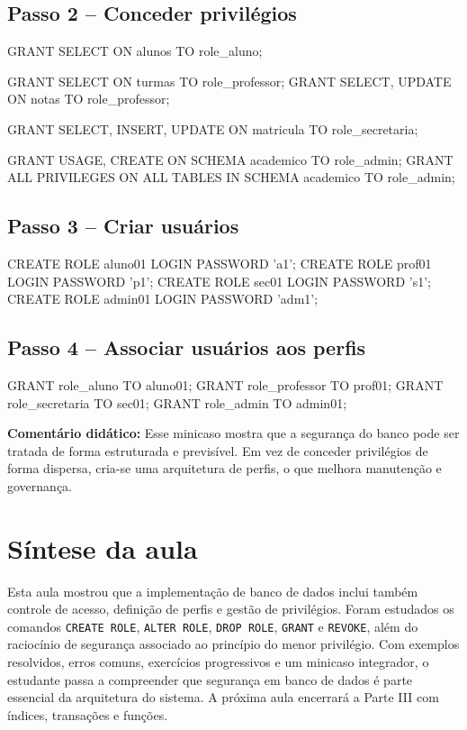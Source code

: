 \subsection*{Passo 2 -- Conceder privilégios}

\begin{sqlcode}
GRANT SELECT ON alunos TO role_aluno;

GRANT SELECT ON turmas TO role_professor;
GRANT SELECT, UPDATE ON notas TO role_professor;

GRANT SELECT, INSERT, UPDATE ON matricula TO role_secretaria;

GRANT USAGE, CREATE ON SCHEMA academico TO role_admin;
GRANT ALL PRIVILEGES ON ALL TABLES IN SCHEMA academico TO role_admin;
\end{sqlcode}

\subsection*{Passo 3 -- Criar usuários}

\begin{sqlcode}
CREATE ROLE aluno01 LOGIN PASSWORD 'a1';
CREATE ROLE prof01 LOGIN PASSWORD 'p1';
CREATE ROLE sec01 LOGIN PASSWORD 's1';
CREATE ROLE admin01 LOGIN PASSWORD 'adm1';
\end{sqlcode}

\subsection*{Passo 4 -- Associar usuários aos perfis}

\begin{sqlcode}
GRANT role_aluno TO aluno01;
GRANT role_professor TO prof01;
GRANT role_secretaria TO sec01;
GRANT role_admin TO admin01;
\end{sqlcode}

\textbf{Comentário didático:}
Esse minicaso mostra que a segurança do banco pode ser tratada de forma estruturada e previsível. Em vez de conceder privilégios de forma dispersa, cria-se uma arquitetura de perfis, o que melhora manutenção e governança.

\section{Síntese da aula}

Esta aula mostrou que a implementação de banco de dados inclui também controle de acesso, definição de perfis e gestão de privilégios. Foram estudados os comandos \texttt{CREATE ROLE}, \texttt{ALTER ROLE}, \texttt{DROP ROLE}, \texttt{GRANT} e \texttt{REVOKE}, além do raciocínio de segurança associado ao princípio do menor privilégio. Com exemplos resolvidos, erros comuns, exercícios progressivos e um minicaso integrador, o estudante passa a compreender que segurança em banco de dados é parte essencial da arquitetura do sistema. A próxima aula encerrará a Parte III com índices, transações e funções.